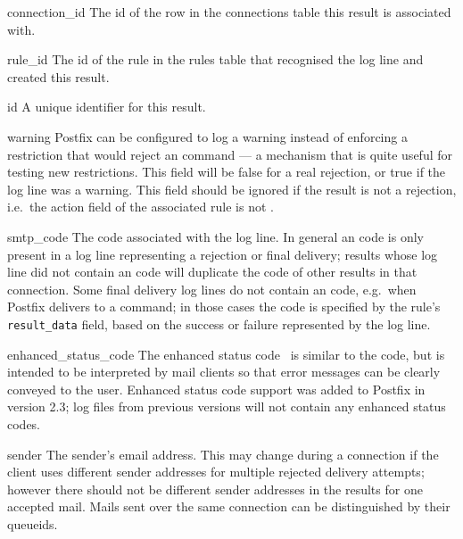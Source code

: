 \begin{boldeqlist}

    \item [connection\_id] The id of the row in the connections table this
        result is associated with.

    \item [rule\_id] The id of the rule in the rules table that recognised
        the log line and created this result.

    \item [id] A unique identifier for this result.

    \item [warning] Postfix can be configured to log a warning instead of
        enforcing a restriction that would reject an  command
        --- a mechanism that is quite useful for testing new restrictions.
        This field will be false for a real rejection, or true if the log
        line was a warning.  This field should be ignored if the result is
        not a rejection, i.e.\ the action field of the associated rule is
        not .

    \item [smtp\_code] The  code associated with the log
        line.  In general an  code is only present in a log
        line representing a rejection or final delivery; results whose log
        line did not contain an  code will duplicate the
         code of other results in that connection.  Some
        final delivery log lines do not contain an  code,
        e.g.\ when Postfix delivers to a command; in those cases the
         code is specified by the rule's
        \texttt{result\_data} field, based on the success or failure
        represented by the log line.

    \item [enhanced\_status\_code] The enhanced status code~\cite{RFC3463}
        is similar to the  code, but is intended to be
        interpreted by mail clients so that error messages can be clearly
        conveyed to the user.  Enhanced status code support was added to
        Postfix in version 2.3; log files from previous versions will not
        contain any enhanced status codes.

    \item [sender] The sender's email address.  This may change during a
        connection if the client uses different sender addresses for
        multiple rejected delivery attempts; however there should not be
        different sender addresses in the results for one accepted mail.
        Mails sent over the same connection can be distinguished by their
        queueids.


\end{boldeqlist}
